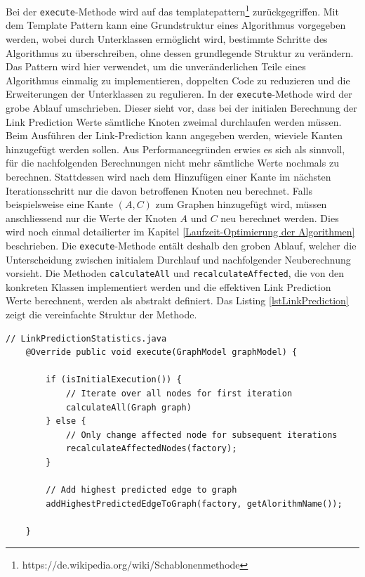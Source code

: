 Bei der \texttt{execute}-Methode wird auf das \acs{templatepattern}\footnote{https://de.wikipedia.org/wiki/Schablonenmethode} zurückgegriffen. Mit dem Template Pattern kann eine Grundstruktur eines Algorithmus vorgegeben werden, wobei durch Unterklassen ermöglicht wird, bestimmte Schritte des Algorithmus zu überschreiben, ohne dessen grundlegende Struktur zu verändern.
Das Pattern wird hier verwendet, um die unveränderlichen Teile eines Algorithmus einmalig zu implementieren, doppelten Code zu reduzieren und die Erweiterungen der Unterklassen zu regulieren.
In der \texttt{execute}-Methode wird der grobe Ablauf umschrieben.
Dieser sieht vor, dass bei der initialen Berechnung der Link Prediction Werte sämtliche Knoten zweimal durchlaufen werden müssen.
Beim Ausführen der Link-Prediction kann angegeben werden, wieviele Kanten hinzugefügt werden sollen.
Aus Performancegründen erwies es sich als sinnvoll, für die nachfolgenden Berechnungen nicht mehr sämtliche Werte nochmals zu berechnen.
Stattdessen wird nach dem Hinzufügen einer Kante im nächsten Iterationsschritt nur die davon betroffenen Knoten neu berechnet.
Falls beispielsweise eine Kante $(A, C)$ zum Graphen hinzugefügt wird, müssen anschliessend nur die Werte der Knoten $A$ und $C$ neu berechnet werden.
Dies wird noch einmal detailierter im Kapitel \ref{Laufzeit-Optimierung der Algorithmen} beschrieben.
Die \texttt{execute}-Methode entält deshalb den groben Ablauf, welcher die Unterscheidung zwischen initialem Durchlauf und nachfolgender Neuberechnung vorsieht.
Die Methoden \texttt{calculateAll} und \texttt{recalculateAffected}, die von den konkreten Klassen implementiert werden und die effektiven Link Prediction Werte berechnent, werden als abstrakt definiert.
Das Listing \ref{lstLinkPrediction} zeigt die vereinfachte Struktur der Methode.

\begin{lstlisting}[caption={Link prediction implementation},label=lstLinkPrediction]
    // LinkPredictionStatistics.java
    @Override public void execute(GraphModel graphModel) {

        if (isInitialExecution()) {
            // Iterate over all nodes for first iteration
            calculateAll(Graph graph)
        } else {
            // Only change affected node for subsequent iterations
            recalculateAffectedNodes(factory);
        }

        // Add highest predicted edge to graph
        addHighestPredictedEdgeToGraph(factory, getAlorithmName());

    }
\end{lstlisting}

